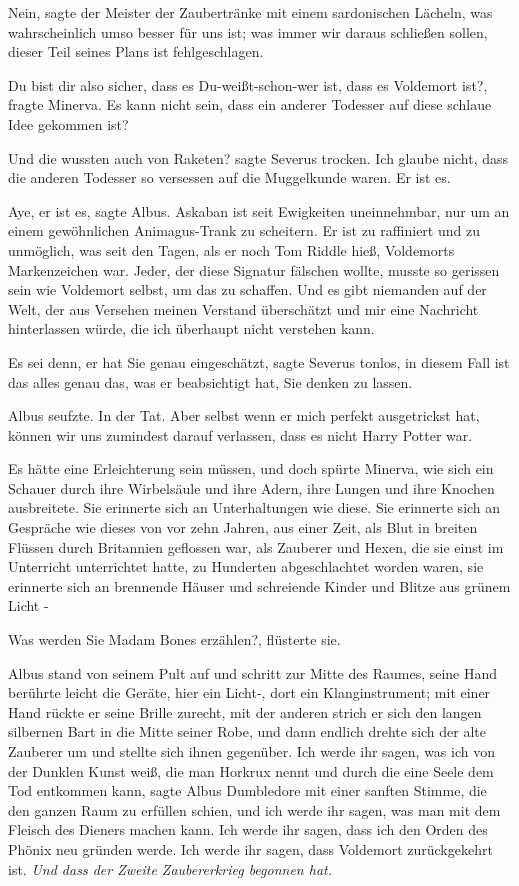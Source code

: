 \glqq Nein\grqq{}, sagte der Meister der Zaubertränke mit einem sardonischen
Lächeln, \glqq was wahrscheinlich umso besser für uns ist; was immer wir daraus
schließen sollen, dieser Teil seines Plans ist fehlgeschlagen.\grqq{}

\glqq Du bist dir also sicher, dass es Du-weißt-schon-wer ist, dass es Voldemort
ist?\grqq{}, fragte Minerva. \glqq Es kann nicht sein, dass ein anderer Todesser
auf diese schlaue Idee gekommen ist?\grqq{}

\glqq Und die wussten auch von Raketen?\grqq{} sagte Severus trocken. \glqq Ich
glaube nicht, dass die anderen Todesser so versessen auf die Muggelkunde waren.
Er ist es.\grqq{}

\glqq Aye, er ist es\grqq{}, sagte Albus. \glqq Askaban ist seit Ewigkeiten
uneinnehmbar, nur um an einem gewöhnlichen Animagus-Trank zu scheitern. Er ist
zu raffiniert und zu unmöglich, was seit den Tagen, als er noch Tom Riddle hieß,
Voldemorts Markenzeichen war. Jeder, der diese Signatur fälschen wollte, musste
so gerissen sein wie Voldemort selbst, um das zu schaffen. Und es gibt niemanden
auf der Welt, der aus Versehen meinen Verstand überschätzt und mir eine
Nachricht hinterlassen würde, die ich überhaupt nicht verstehen kann.\grqq{}

\glqq Es sei denn, er hat Sie genau eingeschätzt\grqq{}, sagte Severus tonlos,
\glqq in diesem Fall ist das alles genau das, was er beabsichtigt hat, Sie
denken zu lassen.\grqq{}

Albus seufzte. \glqq In der Tat. Aber selbst wenn er mich perfekt ausgetrickst
hat, können wir uns zumindest darauf verlassen, dass es nicht Harry Potter
war.\grqq{}

Es hätte eine Erleichterung sein müssen, und doch spürte Minerva, wie sich ein
Schauer durch ihre Wirbelsäule und ihre Adern, ihre Lungen und ihre Knochen
ausbreitete. Sie erinnerte sich an Unterhaltungen wie diese. Sie erinnerte sich
an Gespräche wie dieses von vor zehn Jahren, aus einer Zeit, als Blut in breiten
Flüssen durch Britannien geflossen war, als Zauberer und Hexen, die sie einst im
Unterricht unterrichtet hatte, zu Hunderten abgeschlachtet worden waren, sie
erinnerte sich an brennende Häuser und schreiende Kinder und Blitze aus grünem
Licht -

\glqq Was werden Sie Madam Bones erzählen?\grqq{}, flüsterte sie.

Albus stand von seinem Pult auf und schritt zur Mitte des Raumes, seine Hand
berührte leicht die Geräte, hier ein Licht-, dort ein Klanginstrument; mit einer
Hand rückte er seine Brille zurecht, mit der anderen strich er sich den langen
silbernen Bart in die Mitte seiner Robe, und dann endlich drehte sich der alte
Zauberer um und stellte sich ihnen gegenüber. \glqq Ich werde ihr sagen, was ich
von der Dunklen Kunst weiß, die man Horkrux nennt und durch die eine Seele dem
Tod entkommen kann\grqq{}, sagte Albus Dumbledore mit einer sanften Stimme, die
den ganzen Raum zu erfüllen schien, \glqq und ich werde ihr sagen, was man mit
dem Fleisch des Dieners machen kann. Ich werde ihr sagen, dass ich den Orden des
Phönix neu gründen werde. Ich werde ihr sagen, dass Voldemort zurückgekehrt ist.
\emph{Und dass der Zweite Zaubererkrieg begonnen hat.}\grqq{}

